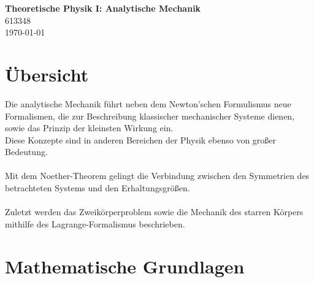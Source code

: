 \documentclass{article}
\begin{document}
\begin{center}
	\Large{\textbf{Theoretische Physik I: Analytische Mechanik}}\\
	\small{613348}\\
	\small{\today}
\end{center}

\tableofcontents


\newpage


\section*{Übersicht}
Die analytische Mechanik führt neben dem Newton'schen Formulismus neue Formalismen, die zur Beschreibung klassischer mechanischer Systeme dienen, sowie das Prinzip der kleinsten Wirkung ein.\\
Diese Konzepte sind in anderen Bereichen der Physik ebenso von großer Bedeutung.\\
\\
Mit dem Noether-Theorem gelingt die Verbindung zwischen den Symmetrien des betrachteten Systems und den Erhaltungsgrößen.\\
\\
Zuletzt werden das Zweikörperproblem sowie die Mechanik des starren Körpers mithilfe des Lagrange-Formalismus beschrieben.


\newpage


\section{Mathematische Grundlagen}
\end{document}
